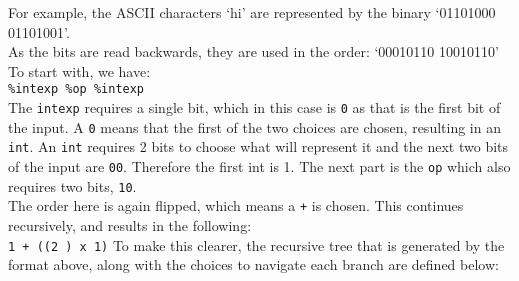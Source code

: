 For example, the ASCII characters `hi' are represented by the binary `01101000 01101001'.\\
As the bits are read backwards, they are used in the order: `00010110 10010110'\\
To start with, we have:\\
\texttt{\%intexp \%op \%intexp}\\
The \texttt{intexp} requires a single bit, which in this case is \texttt{0} as that is the first bit of the input. A \texttt{0} means that the first of the two choices are chosen, resulting in an \texttt{int}. An \texttt{int} requires 2 bits to choose what will represent it and the next two bits of the input are \texttt{00}.
Therefore the first int is 1. The next part is the \texttt{op} which also requires two bits, \texttt{10}.\\
The order here is again flipped, which means a \texttt{+} is chosen.
This continues recursively, and results in the following: \\
\texttt{1 + ((2 ) x 1)}\newpage
To make this clearer, the recursive tree that is generated by the format above, along with the choices to navigate each branch are defined below:
